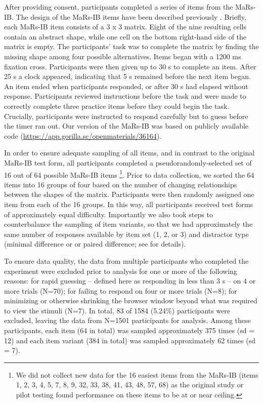 \documentclass[a4paper,man,natbib]{apa6}
\begin{document}
After providing consent, participants completed a series of items from the MaRs-IB. The design of the MaRs-IB items have been described previously \citep{chierchia2019matrix}. Briefly, each MaRs-IB item consists of a 3 x 3 matrix. Eight of the nine resulting cells contain an abstract shape, while one cell on the bottom right-hand side of the matrix is empty. The participants' task was to complete the matrix by finding the missing shape among four possible alternatives. Items began with a 1200 ms fixation cross. Participants were then given up to 30 s to complete an item. After 25 s a clock appeared, indicating that 5 s remained before the next item began. An item ended when participants responded, or after 30 s had elapsed without response. Participants reviewed instructions before the task and were made to correctly complete three practice items before they could begin the task. Crucially, participants were instructed to respond carefully but to guess before the timer ran out. Our version of the MaRs-IB was based on publicly available code (\url{https://app.gorilla.sc/openmaterials/36164}).

In order to ensure adequate sampling of all items, and in contrast to the original MaRs-IB test form, all participants completed a pseudorandomly-selected set of 16 out of 64 possible MaRs-IB items \footnote{We did not collect new data for the 16 easiest items from the MaRs-IB (items 1, 2, 3, 4, 5, 7, 8, 9, 32, 33, 38, 41, 43, 48, 57, 68) as the original study or pilot testing found performance on these items to be at or near ceiling.}. Prior to data collection, we sorted the 64 items into 16 groups of four based on the number of changing relationships between the shapes of the matrix. Participants were then randomly assigned one item from each of the 16 groups. In this way, all participants received test forms of approximately equal difficulty. Importantly we also took steps to counterbalance the sampling of item variants, so that we had approximately the same number of responses available by item set (1, 2, or 3) and distractor type (minimal difference or or paired difference; see \cite{chierchia2019matrix} for details). 

To ensure data quality, the data from multiple participants who completed the experiment were excluded prior to analysis for one or more of the following reasons: for rapid guessing -- defined here as responding in less than 3 s -- on 4 or more trials (N=70); for failing to respond on four or more trials (N=8); for minimizing or otherwise shrinking the browser window beyond what was required to view the stimuli (N=7). In total, 83 of 1584 (5.24\%) participants were excluded, leaving the data from N=1501 participants for analysis. Among these participants, each item (64 in total) was sampled approximately 375 times (sd = 12) and each item variant (384 in total) was sampled approximately 62 times (sd = 7). 
\end{document}
